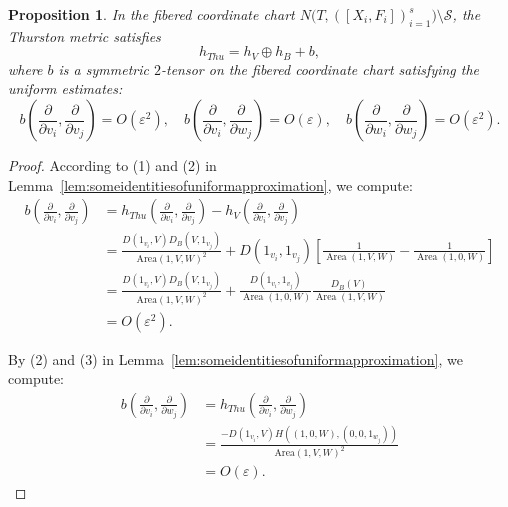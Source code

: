 \documentclass{compositio}
\numberwithin{equation}{section}
\numberwithin{figure}{section}
\theoremstyle{definition}
\theoremstyle{plain}
\newtheorem{proposition}[definition]{Proposition}
\begin{document}
{\begin{proposition}\label{prop:metricapproximation}
In the fibered coordinate chart $N\big(T, ([X_i, F_i])_{i=1}^s\big) \setminus \mathcal{S}$, the Thurston metric satisfies
    $$
    h_{Thu} = h_{V} \oplus h_B + b,
    $$
    where $b$ is a symmetric $2$-tensor on the fibered coordinate chart satisfying the uniform estimates:
    $$
    b\left(\frac{\partial}{\partial v_i}, \frac{\partial}{\partial v_j}\right) = O(\varepsilon^2),
    \quad
    b\left(\frac{\partial}{\partial v_i}, \frac{\partial}{\partial w_j}\right) = O(\varepsilon),
    \quad
    b\left(\frac{\partial}{\partial w_i}, \frac{\partial}{\partial w_j}\right) = O(\varepsilon^2).
    $$
\end{proposition}

\begin{proof}
According to (1) and (2) in Lemma~\ref{lem:someidentitiesofuniformapproximation}, we compute:
\begin{align*}
    b\left(\frac{\partial}{\partial v_i}, \frac{\partial}{\partial v_j}\right)
    &= h_{Thu}\left(\frac{\partial}{\partial v_i}, \frac{\partial}{\partial v_j}\right) - h_V\left(\frac{\partial}{\partial v_i}, \frac{\partial}{\partial v_j}\right)\\
    &= \frac{D(1_{v_i}, V)D_B(V,1_{v_j})}{\mathrm{Area}(1,V,W)^2} + 
       D(1_{v_i},1_{v_j})\left[\frac{1}{\operatorname{Area}(1,V,W)} - \frac{1}{\operatorname{Area}(1,0,W)}\right]\\
    &= \frac{D(1_{v_i}, V)D_B(V,1_{v_j})}{\mathrm{Area}(1,V,W)^2} + 
       \frac{D(1_{v_i},1_{v_j})}{\operatorname{Area}(1,0,W)}\frac{D_B(V)}{\operatorname{Area}(1,V,W)}\\
    &= O(\varepsilon^2).
\end{align*}

By (2) and (3) in Lemma~\ref{lem:someidentitiesofuniformapproximation}, we compute:
\begin{align*}
    b\left(\frac{\partial}{\partial v_i}, \frac{\partial}{\partial w_j}\right)
    &= h_{Thu}\left(\frac{\partial}{\partial v_i}, \frac{\partial}{\partial w_j}\right) \\
    &= \frac{-D(1_{v_i}, V)H((1,0,W),(0,0,1_{w_j}))}{\mathrm{Area}(1,V,W)^2} \\
    &= O(\varepsilon).
\end{align*}


\end{proof}}
\end{document}
